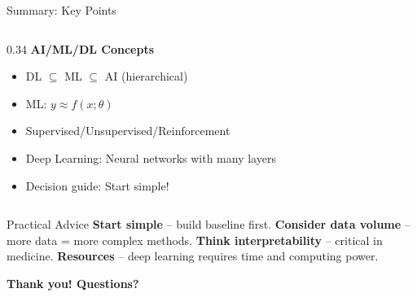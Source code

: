 \documentclass[aspectratio=169, 10pt]{beamer}
\begin{document}
\begin{frame}{Summary: Key Points}
\begin{columns}
        \begin{column}{0.34\textwidth}
            \textbf{\footnotesize AI/ML/DL Concepts}
            \scriptsize
            \begin{itemize}\setlength{\itemsep}{0pt}
                \item DL $\subseteq$ ML $\subseteq$ AI (hierarchical)
                \item ML: $y \approx f(x; \theta)$
                \item Supervised/Unsupervised/Reinforcement
                \item Deep Learning: Neural networks with many layers
                \item Decision guide: Start simple!
            \end{itemize}
        \end{column}
    \end{columns}

    \vspace{3mm}
    \begin{block}{\footnotesize Practical Advice}
        \footnotesize
        \textbf{Start simple} -- build baseline first. \textbf{Consider data volume} -- more data = more complex methods. \textbf{Think interpretability} -- critical in medicine. \textbf{Resources} -- deep learning requires time and computing power.
    \end{block}

    \vspace{2mm}
    \begin{center}
        \textbf{\large Thank you! Questions?}
    \end{center}

\end{frame}
\end{document}
